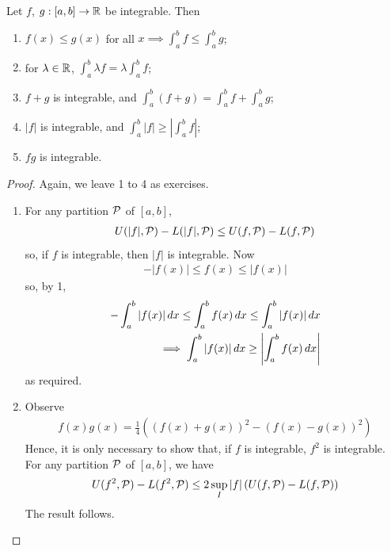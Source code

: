 \documentclass{../../template/note}
\begin{document}
    \begin{lemma}
        Let \(f\), \(g: [a, b] \to \mathbb R\) be integrable. Then
        \begin{enumerate}
            \item \(f(x) \leq g(x)\) for all \(x \implies \int_a^b f \leq \int_a^b g\);
            \item[2, 3.] for \(\lambda \in \mathbb R\), \(\int_a^b \lambda f = \lambda \int_a^b f\);
            \item[4] \(f+g\) is integrable, and \(\int_a^b (f+g) = \int_a^b f + \int_a^b g\);
            \item[5] \(|f|\) is integrable, and \(\int_a^b |f| \geq \left|\int_a^b f\right|\);
            \item[6] \(fg\) is integrable.
        \end{enumerate}
    \end{lemma}
    
    \begin{proof}
        Again, we leave 1 to 4 as exercises.
        \begin{enumerate}
            \item[5.] For any partition \(\mathcal{P}\) of \([a, b]\),
            \begin{align*}
                U(|f|, \mathcal{P}) - L(|f|, \mathcal{P}) \leq U(f, \mathcal{P}) - L(f, \mathcal{P})
            \end{align*}
            so, if \(f\) is integrable, then \(|f|\) is integrable. Now
            \begin{align*}
                -|f(x)| \leq f(x) \leq |f(x)|
            \end{align*}
            so, by 1,
            \begin{align*}
                -\int_a^b |f(x)| \,d{x} \leq \int_a^b f(x) \,d{x} \leq \int_a^b |f(x)| \,d{x} \\
                \implies \int_a^b |f(x)| \,d{x} \geq \left|\int_a^b f(x) \,d{x}\right|
            \end{align*}
            as required.
            \item[6.] Observe
            \begin{align*}
                f(x)g(x) = \frac 1 4 \left((f(x)+g(x))^2-(f(x)-g(x))^2\right)
            \end{align*}
            Hence, it is only necessary to show that, if \(f\) is integrable, \(f^2\) is integrable. For any partition \(\mathcal{P}\) of \([a, b]\), we have
            \begin{align*}
                U(f^2, \mathcal{P}) - L(f^2, \mathcal{P}) \leq 2 \sup_I |f| \left(U(f, \mathcal{P}) - L(f, \mathcal{P})\right)
            \end{align*}
            The result follows.
        \end{enumerate}
    \end{proof}
    
\end{document}
